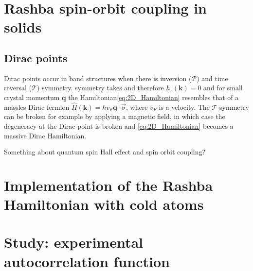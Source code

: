 \section{Rashba spin-orbit coupling in solids}
\subsection{Dirac points}
Dirac points occur in band structures when there is inversion ($\mathcal{P}$) and time reversal ($\mathcal{T}$) symmetry.   symmetry takes and therefore $h_z(\mathbf{k})=0$ and for small crystal momentum $\mathbf{q}$ the Hamiltonian\ref{eq:2D_Hamiltonian} resembles that of a massles Dirac fermion $\hat H(\mathbf k)=\hbar v_F\mathbf q\cdot \vec \sigma$, where $v_F$ is a velocity. The $\mathcal{T}$ symmetry can be broken for example by applying a magnetic field, in which case the degeneracy at the Dirac point is broken and \ref{eq:2D_Hamiltonian} becomes a massive Dirac Hamiltonian. 

Something about quantum spin Hall effect and spin orbit coupling?
\section{Implementation of the Rashba Hamiltonian with cold atoms}

\section{Study: experimental autocorrelation function}


